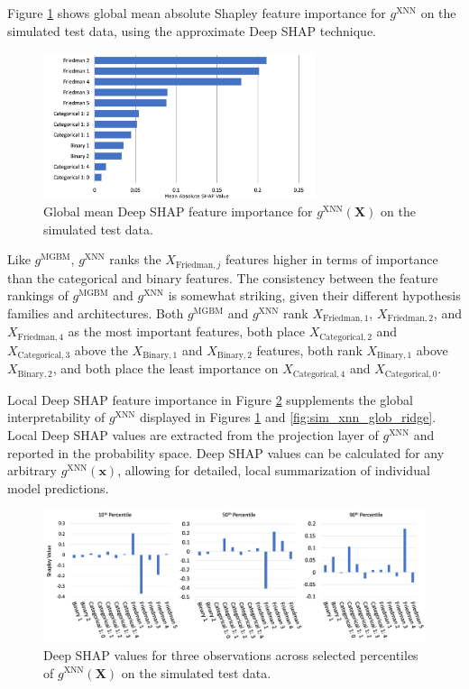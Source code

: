 \documentclass[information,article,submit,moreauthors,pdftex]{definitions/mdpi}
\begin{document}
Figure \ref{fig:sim_xnn_glob} shows global mean absolute Shapley feature importance for $g^\text{XNN}$ on the simulated test data, using the approximate Deep SHAP technique.  

\begin{figure}[htb]
	\centering
	\includegraphics[width=8cm]{img/sim_xnn_glob.png}
	\caption{Global mean Deep SHAP feature importance for $g^\text{XNN}(\mathbf{X})$ on the simulated test data.}
	\label{fig:sim_xnn_glob}
\end{figure} 

\noindent Like $g^\text{MGBM}$, $g^\text{XNN}$ ranks the $X_{\text{Friedman},j}$ features higher in terms of importance than the categorical and binary features. The consistency between the feature rankings of $g^\text{MGBM}$ and $g^\text{XNN}$ is somewhat striking, given their different hypothesis families and architectures. Both $g^\text{MGBM}$ and $g^\text{XNN}$ rank $X_{\text{Friedman},1}$, $X_{\text{Friedman},2}$, and $X_{\text{Friedman},4}$ as the most important features, both place $X_{\text{Categorical},2}$ and $X_{\text{Categorical},3}$ above the $X_{\text{Binary},1}$ and $X_{\text{Binary},2}$ features, both rank $X_{\text{Binary},1}$ above $X_{\text{Binary},2}$, and both place the least importance on $X_{\text{Categorical},4}$ and $X_{\text{Categorical},0}$. 

Local Deep SHAP feature importance in Figure \ref{fig:sim_xnn_loc} supplements the global interpretability of $g^\text{XNN}$ displayed in Figures \ref{fig:sim_xnn_glob} and \ref{fig:sim_xnn_glob_ridge}. Local Deep SHAP values are extracted from the projection layer of $g^\text{XNN}$ and reported in the probability space. Deep SHAP values can be calculated for any arbitrary $g^\text{XNN}(\mathbf{x})$, allowing for detailed, local summarization of individual model predictions. 

\begin{figure}[htb]
	\centering
	\includegraphics[width=15cm]{img/sim_xnn_loc.png}
	\caption{Deep SHAP values for three observations across selected percentiles of $g^\text{XNN}(\mathbf{X})$ on the simulated test data.}
	\label{fig:sim_xnn_loc}
\end{figure}  
\end{document}
